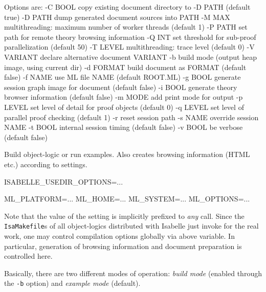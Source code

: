 \begin{isabellebody}
\begin{isamarkuptext}
\begin{ttbox}
  Options are:
    -C BOOL      copy existing document directory to -D PATH (default true)
    -D PATH      dump generated document sources into PATH
    -M MAX       multithreading: maximum number of worker threads (default 1)
    -P PATH      set path for remote theory browsing information
    -Q INT       set threshold for sub-proof parallelization (default 50)
    -T LEVEL     multithreading: trace level (default 0)
    -V VARIANT   declare alternative document VARIANT
    -b           build mode (output heap image, using current dir)
    -d FORMAT    build document as FORMAT (default false)
    -f NAME      use ML file NAME (default ROOT.ML)
    -g BOOL      generate session graph image for document (default false)
    -i BOOL      generate theory browser information (default false)
    -m MODE      add print mode for output
    -p LEVEL     set level of detail for proof objects (default 0)
    -q LEVEL     set level of parallel proof checking (default 1)
    -r           reset session path
    -s NAME      override session NAME
    -t BOOL      internal session timing (default false)
    -v BOOL      be verbose (default false)

  Build object-logic or run examples. Also creates browsing
  information (HTML etc.) according to settings.

  ISABELLE_USEDIR_OPTIONS=...

  ML_PLATFORM=...
  ML_HOME=...
  ML_SYSTEM=...
  ML_OPTIONS=...
\end{ttbox}

  Note that the value of the \hyperlink{setting.ISABELLE-USEDIR-OPTIONS}{\mbox{}}
  setting is implicitly prefixed to \emph{any} \hyperlink{tool.usedir}{\mbox{}}
  call. Since the \verb|IsaMakefile|s of all object-logics
  distributed with Isabelle just invoke \hyperlink{tool.usedir}{\mbox{}} for the real
  work, one may control compilation options globally via above
  variable. In particular, generation of  browsing
  information and document preparation is controlled here.%
\end{isamarkuptext}%
\isamarkuptrue%
%
\isamarkuptrue%
%
\begin{isamarkuptext}%
Basically, there are two different modes of operation: \emph{build
  mode} (enabled through the \verb|-b| option) and
  \emph{example mode} (default).


\end{isamarkuptext}
\end{isabellebody}
